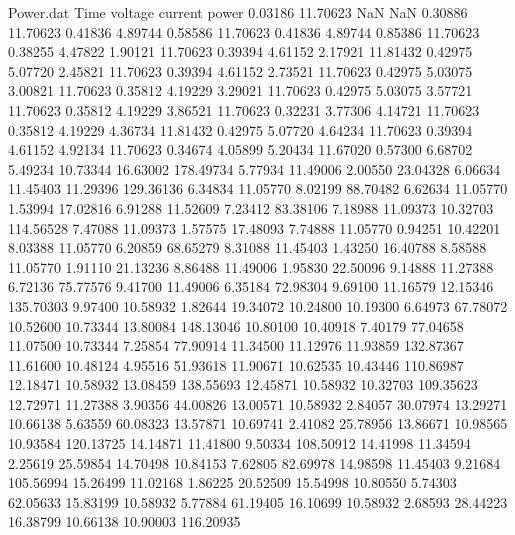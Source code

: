 \begin{filecontents}{Power.dat}
Time voltage current power
   0.03186   11.70623        NaN        NaN
   0.30886   11.70623    0.41836    4.89744
   0.58586   11.70623    0.41836    4.89744
   0.85386   11.70623    0.38255    4.47822
   1.90121   11.70623    0.39394    4.61152
   2.17921   11.81432    0.42975    5.07720
   2.45821   11.70623    0.39394    4.61152
   2.73521   11.70623    0.42975    5.03075
   3.00821   11.70623    0.35812    4.19229
   3.29021   11.70623    0.42975    5.03075
   3.57721   11.70623    0.35812    4.19229
   3.86521   11.70623    0.32231    3.77306
   4.14721   11.70623    0.35812    4.19229
   4.36734   11.81432    0.42975    5.07720
   4.64234   11.70623    0.39394    4.61152
   4.92134   11.70623    0.34674    4.05899
   5.20434   11.67020    0.57300    6.68702
   5.49234   10.73344   16.63002  178.49734
   5.77934   11.49006    2.00550   23.04328
   6.06634   11.45403   11.29396  129.36136
   6.34834   11.05770    8.02199   88.70482
   6.62634   11.05770    1.53994   17.02816
   6.91288   11.52609    7.23412   83.38106
   7.18988   11.09373   10.32703  114.56528
   7.47088   11.09373    1.57575   17.48093
   7.74888   11.05770    0.94251   10.42201
   8.03388   11.05770    6.20859   68.65279
   8.31088   11.45403    1.43250   16.40788
   8.58588   11.05770    1.91110   21.13236
   8.86488   11.49006    1.95830   22.50096
   9.14888   11.27388    6.72136   75.77576
   9.41700   11.49006    6.35184   72.98304
   9.69100   11.16579   12.15346  135.70303
   9.97400   10.58932    1.82644   19.34072
  10.24800   10.19300    6.64973   67.78072
  10.52600   10.73344   13.80084  148.13046
  10.80100   10.40918    7.40179   77.04658
  11.07500   10.73344    7.25854   77.90914
  11.34500   11.12976   11.93859  132.87367
  11.61600   10.48124    4.95516   51.93618
  11.90671   10.62535   10.43446  110.86987
  12.18471   10.58932   13.08459  138.55693
  12.45871   10.58932   10.32703  109.35623
  12.72971   11.27388    3.90356   44.00826
  13.00571   10.58932    2.84057   30.07974
  13.29271   10.66138    5.63559   60.08323
  13.57871   10.69741    2.41082   25.78956
  13.86671   10.98565   10.93584  120.13725
  14.14871   11.41800    9.50334  108.50912
  14.41998   11.34594    2.25619   25.59854
  14.70498   10.84153    7.62805   82.69978
  14.98598   11.45403    9.21684  105.56994
  15.26499   11.02168    1.86225   20.52509
  15.54998   10.80550    5.74303   62.05633
  15.83199   10.58932    5.77884   61.19405
  16.10699   10.58932    2.68593   28.44223
  16.38799   10.66138   10.90003  116.20935

\end{filecontents}
